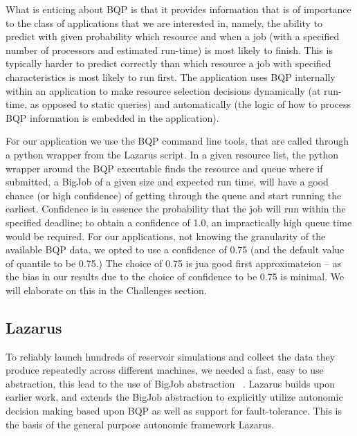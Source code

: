 \documentclass[conference,final]{IEEEtran}
\newcommand{\jhanote}[1]{ {\textcolor{red} { ***Jha: #1 }}}
\newcommand{\yyenote}[1]{ {\textcolor{blue} { ***yye00: #1 }}}
\newcommand{\jhanote}[1]{}
\newcommand{\yyenote}[1]{}
\begin{document}
What is enticing about BQP is that it provides information that is of
importance to the class of applications that we are interested in,
namely, the ability to predict with given probability which resource
and when a job (with a specified number of processors and estimated
run-time) is most likely to finish.  This is typically harder to
predict correctly than which resource a job with specified
characteristics is most likely to run first.  The application uses BQP
internally within an application to make resource selection decisions
dynamically (at run-time, as opposed to static queries) and
automatically (the logic of how to process BQP information is embedded
in the application).

For our application we use the BQP command line tools, that are called
through a python wrapper from the Lazarus script.  In a given resource
list, the python wrapper around the BQP executable finds the resource
and queue where if submitted, a BigJob of a given size and expected
run time, will have a good chance (or high confidence) of getting
through the queue and start running the earliest. Confidence is in
essence the probability that the job will run within the specified
deadline; to obtain a confidence of 1.0, an impractically high
queue time would be required. For our applications, not knowing the
granularity of the available BQP data, we opted to use a confidence of
0.75 (and the default value of quantile to be 0.75.)  The choice of
0.75 is jua good first approximateion -- as the bias in our results due
to the choice of confidence to be 0.75 is minimal. We will elaborate
on this in the Challenges section.


\subsection{Lazarus}



To reliably launch hundreds of reservoir simulations and collect the data
they produce repeatedly across different machines,
we needed a fast, easy to use abstraction, this lead to the use
of BigJob abstraction ~\cite{ICCS_paper, saga_royalsoc}.
Lazarus builds upon earlier work, and extends the BigJob abstraction
to explicitly utilize autonomic decision making based upon 
BQP as well as support for fault-tolerance. This is the basis of 
the general purpose autonomic framework Lazarus.
\end{document}
